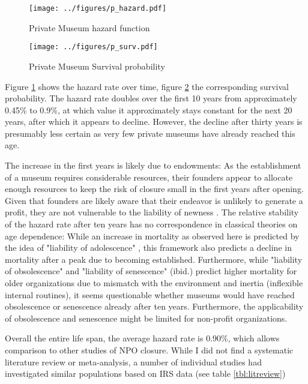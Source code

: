 \documentclass[12pt]{article}
\begin{document}
\begin{figure}[htbp]
\centering
\texttt{[image: ../figures/p\_hazard.pdf]}
\caption{\label{fig:p_hazard}Private Museum hazard function}
\end{figure}

\begin{figure}[htbp]
\centering
\texttt{[image: ../figures/p\_surv.pdf]}
\caption{\label{fig:p_surv}Private Museum Survival probability}
\end{figure}


Figure \ref{fig:p_hazard} shows the hazard rate over time, figure \ref{fig:p_surv} the corresponding survival probability.
The hazard rate doubles over the first 10 years from approximately 0.45\% to 0.9\%, at which value it approximately stays constant for the next 20 years, after which it appears to decline.
However, the decline after thirty years is presumably less certain as very few private museums have already reached this age.


The increase in the first years is likely due to endowments: As the establishment of a museum requires considerable resources, their founders appear to allocate enough resources to keep the risk of closure small in the first years after opening.
Given that founders are likely aware that their endeavor is unlikely to generate a profit, they are not vulnerable to the liability of newness \parencite{Stinchcombe_1965_structure}.
The relative stability of the hazard rate after ten years has no correspondence in classical theories on age dependence:
While an increase in mortality as observed here is predicted by the idea of "liability of adolescence" \parencite{Carroll_Khessina_2019_demography}, this framework also predicts a decline in mortality after a peak due to becoming established.
Furthermore, while "liability of obsolescence" and "liability of senescence" (ibid.) predict higher mortality for older organizations due to mismatch with the environment and inertia (inflexible internal routines), it seems questionable whether museums would have reached obsolescence or senescence already after ten years.
Furthermore, the applicability of obsolescence and senescence might be limited for non-profit organizations.


Overall the entire life span, the average hazard rate is 0.90\%, which allows comparison to other studies of NPO closure.
While I did not find a systematic literature review or meta-analysis, a number of individual studies had investigated similar populations based on IRS data (see table \ref{tbl:litreview}) 
\end{document}
